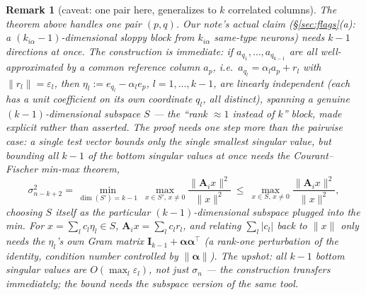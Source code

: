 \documentclass[11pt]{article}
\newcommand{\Mat}[1]{\mathbf{#1}}
\newcommand{\A}{\Mat{A}}
\newcommand{\eps}{\varepsilon}
\newtheorem{remark}{Remark}
\begin{document}
\begin{remark}[caveat: one pair here, generalizes to $k$ correlated columns]
The theorem above handles one pair $(p,q)$. Our note's actual claim
(\S\ref{sec:flags}(a): a $(k_{i\alpha}-1)$-dimensional sloppy block from
$k_{i\alpha}$ same-type neurons) needs $k-1$ directions at once. The
\emph{construction} is immediate: if $a_{q_1},\dots,a_{q_{k-1}}$ are all
well-approximated by a common reference column $a_p$, i.e.\
$a_{q_l}=\alpha_la_p+r_l$ with $\|r_l\|=\eps_l$, then
$\eta_l:=e_{q_l}-\alpha_le_p$, $l=1,\dots,k-1$, are linearly independent
(each has a unit coefficient on its own coordinate $q_l$, all distinct),
spanning a genuine $(k-1)$-dimensional subspace $S$ --- the ``rank
$\approx1$ instead of $k$'' block, made explicit rather than asserted. The
\emph{proof} needs one step more than the pairwise case: a single test
vector bounds only the single smallest singular value, but bounding all
$k-1$ of the bottom singular values at once needs the Courant--Fischer
min-max theorem,
\begin{equation}
\sigma_{n-k+2}^2 = \min_{\dim(S')=k-1}\ \max_{x\in S',\,x\ne0}\frac{\|\A_ix\|^2}{\|x\|^2}
\ \le\ \max_{x\in S,\,x\ne0}\frac{\|\A_ix\|^2}{\|x\|^2} ,
\end{equation}
choosing $S$ itself as the particular $(k{-}1)$-dimensional subspace
plugged into the min. For $x=\sum_lc_l\eta_l\in S$, $\A_ix=\sum_lc_lr_l$,
and relating $\sum_l|c_l|$ back to $\|x\|$ only needs the $\eta_l$'s own
Gram matrix $\Mat I_{k-1}+\boldsymbol\alpha\boldsymbol\alpha^{\!\top}$ (a
rank-one perturbation of the identity, condition number controlled by
$\|\boldsymbol\alpha\|$). The upshot: all $k-1$ bottom singular values are
$O(\max_l\eps_l)$, not just $\sigma_n$ --- the construction transfers
immediately; the bound needs the subspace version of the same tool.
\end{remark}
\end{document}
